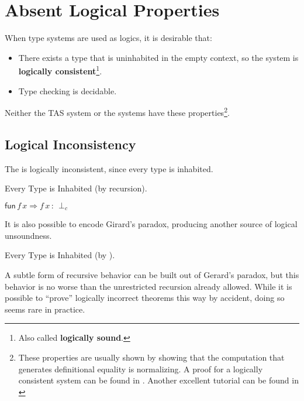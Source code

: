 \section{Absent Logical Properties}
 
When type systems are used as logics, it is desirable that:
\begin{itemize}
\item There exists a type that is uninhabited in the empty context, so the system is \textbf{logically consistent}\footnote{
  Also called \textbf{logically sound}.}.
\item Type checking is decidable.
\end{itemize}
Neither the \ac{TAS} system or the \bidir{} systems have these properties\footnote{
 These properties are usually shown by showing that the computation that generates definitional equality is normalizing.
 A proof for a logically consistent system can be found in \cite[Chapter 4]{luo1994computation}.
 Another excellent tutorial can be found in \cite[Chapter 2]{casinghino2014combiningthesis}}.
 
\subsection{Logical Inconsistency}
 
The \slang{} is logically inconsistent, since every type is inhabited.
 
\begin{example} Every Type is Inhabited (by recursion).
 
$\mathsf{fun}\,f\,x\Rightarrow f\,x\,:\,\perp_{c}$
\end{example}
 
It is also possible to encode Girard's paradox, producing another source of logical unsoundness.
\begin{example} Every Type is Inhabited (by \tit{}).
 
 
\end{example}
 
A subtle form of recursive behavior can be built out of Gerard's paradox\cite{Reinhold89typecheckingis}, but this behavior is no worse than the unrestricted recursion already allowed.
While it is possible to ``prove'' logically incorrect theorems this way by accident, doing so seems rare in practice.
 
